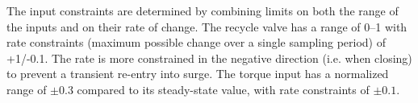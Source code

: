 The input constraints are determined by combining limits on both the range of the inputs and on their rate of change. 
The recycle valve has a range of 0--1 with rate constraints (maximum possible change over a single sampling period) of +1/-0.1. 
The rate is more constrained in the negative direction (i.e. when closing) to prevent a transient re-entry into surge.
The torque input has a normalized range of $\pm 0.3$ compared to its steady-state value, with rate constraints of $\pm 0.1$.

